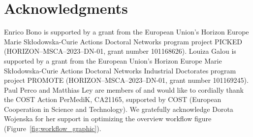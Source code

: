 \section*{Acknowledgments}

Enrico Bono is supported by a grant from the European Union's Horizon Europe Marie Skłodowska-Curie Actions Doctoral Networks program project PICKED (HORIZON--MSCA--2023--DN-01, grant number 101168626). 
Louiza Galou is supported by a grant from the European Union's Horizon Europe Marie Skłodowska-Curie Actions Doctoral Networks Industrial Doctorates program project PROMOTE (HORIZON--MSCA--2023--DN-01, grant number 101169245). 
Paul Perco and Matthias Ley are members of and would like to cordially thank the COST Action PerMediK, CA21165, supported by COST (European Cooperation in Science and Technology).
We gratefully acknowledge Dorota Wojenska for her support in optimizing the overview workflow figure (Figure~\ref{fig:workflow_graphic}).